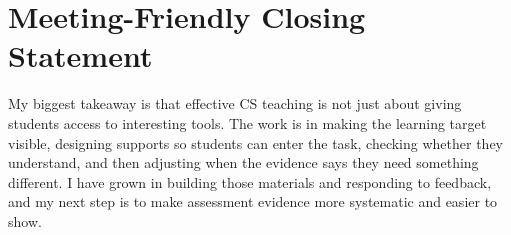\documentclass[10pt]{article}
\begin{document}
\section{Meeting-Friendly Closing Statement}

My biggest takeaway is that effective CS teaching is not just about giving students access to interesting tools. The work is in making the learning target visible, designing supports so students can enter the task, checking whether they understand, and then adjusting when the evidence says they need something different. I have grown in building those materials and responding to feedback, and my next step is to make assessment evidence more systematic and easier to show.
\end{document}
